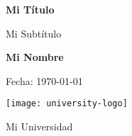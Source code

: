 \newcommand{\datesfont}{\sffamily}

\begin{titlepage}
    \begin{center}
        \vspace*{1cm}
        
        \Huge
        \textbf{Mi Título}
        
        \vspace{0.5cm}
        \LARGE
        Mi Subtítulo
        
        \vspace{1.5cm}
        
        \textbf{Mi Nombre}
        
        \vfill
        
        \large
        Fecha: {\datesfont \today}
        
        \vspace{0.8cm}
        
        \texttt{[image: university-logo]}
        
        \Large
        Mi Universidad
        
    \end{center}
\end{titlepage}